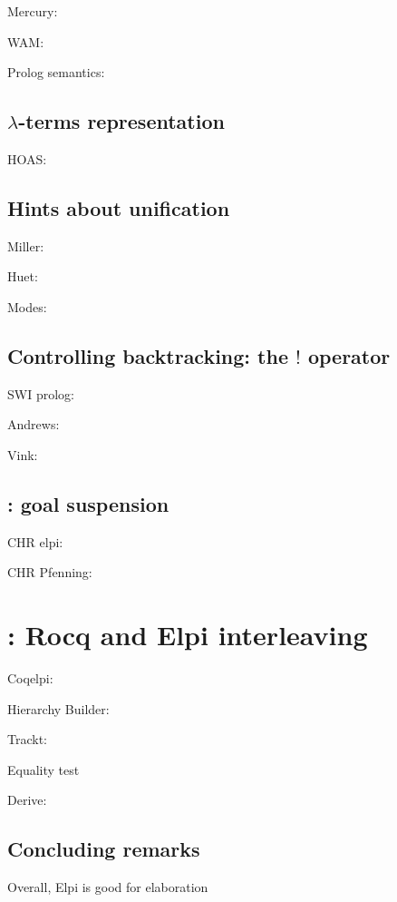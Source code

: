Mercury: \cite{somogy1996}

WAM: \cite{ait1991-wam}

Prolog semantics: \cite{debray1988}

\subsection{\texorpdfstring{$\lambda$}{lambda}-terms representation}

HOAS: \cite{pfenning1988}

\subsection{Hints about unification}

Miller: \cite{miller1991-pf}

Huet: \cite{huet75}

Modes: \cite{zhou2012}

\subsection{Controlling backtracking: the \texorpdfstring{$!$}{cut} operator}

SWI prolog: \cite{swi-prolog-cut}

Andrews:~\cite{andrews2003}

Vink: \cite{vink1989}

\subsection{\chr: goal suspension}

\cite{chr,chr15}

CHR elpi: \cite[section 4.3]{chr-elpi}

CHR Pfenning: \cite{pfenning1993}

\section{\coqelpi: Rocq and Elpi interleaving}

Coqelpi: \cite{tassi2018}

Hierarchy Builder: \cite{hb}

Trackt: \cite{enzo2023}

Equality test~\cite{tassi2023}

Derive: \cite{tassi2019}


\subsection{Concluding remarks}

Overall, Elpi is good for elaboration
